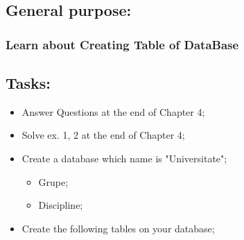 \documentclass[12pt]{article}
\begin{document}
        \pagebreak
        \subsection*{ General purpose:}
        \subsubsection*{ Learn about Creating Table of DataBase}
        
        \subsection*{Tasks:}
        \begin{itemize}
                \item Answer Questions at the end of Chapter 4;
                \item Solve ex. 1, 2 at the end of Chapter 4;
                \item Create a database which name is "Universitate";
                \begin{itemize}
                        \item Grupe;
                        \item Discipline;
                \end{itemize}
                \item Create the following tables on your database;
        \end{itemize}
\end{document}
